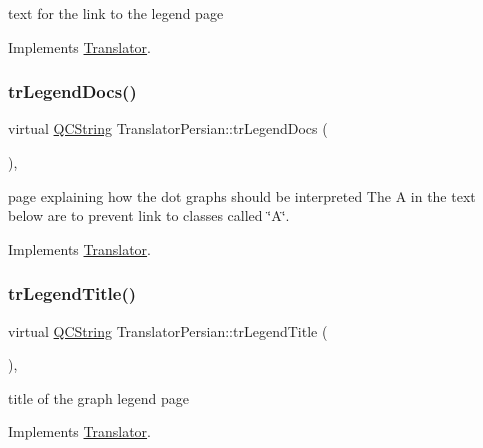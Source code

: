 text for the link to the legend page 

Implements \mbox{\hyperlink{class_translator}{Translator}}.

\mbox{\label{class_translator_persian_a47aa2d45c5f247bf64bd8deda5ed5be3}} 
\subsubsection{\texorpdfstring{trLegendDocs()}{trLegendDocs()}}
{\footnotesize\ttfamily virtual \mbox{\hyperlink{class_q_c_string}{Q\+C\+String}} Translator\+Persian\+::tr\+Legend\+Docs (\begin{DoxyParamCaption}{ }\end{DoxyParamCaption})\hspace{0.3cm}{\ttfamily [inline]}, {\ttfamily [virtual]}}

page explaining how the dot graph\textquotesingle{}s should be interpreted The A in the text below are to prevent link to classes called \char`\"{}\+A\char`\"{}. 

Implements \mbox{\hyperlink{class_translator}{Translator}}.

\mbox{\label{class_translator_persian_a563a02fe67c38f1c64cc53ee67315da4}} 
\subsubsection{\texorpdfstring{trLegendTitle()}{trLegendTitle()}}
{\footnotesize\ttfamily virtual \mbox{\hyperlink{class_q_c_string}{Q\+C\+String}} Translator\+Persian\+::tr\+Legend\+Title (\begin{DoxyParamCaption}{ }\end{DoxyParamCaption})\hspace{0.3cm}{\ttfamily [inline]}, {\ttfamily [virtual]}}

title of the graph legend page 

Implements \mbox{\hyperlink{class_translator}{Translator}}.

\mbox{\label{class_translator_persian_a16bf12fdbe818dc6e925520d9520e5fc}} 
